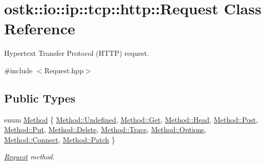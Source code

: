 \hypertarget{classostk_1_1io_1_1ip_1_1tcp_1_1http_1_1_request}{}\section{ostk\+:\+:io\+:\+:ip\+:\+:tcp\+:\+:http\+:\+:Request Class Reference}
\label{classostk_1_1io_1_1ip_1_1tcp_1_1http_1_1_request}


Hypertext Transfer Protocol (H\+T\+TP) request.  




{\ttfamily \#include $<$Request.\+hpp$>$}

\subsection*{Public Types}
\begin{DoxyCompactItemize}
\item 
enum \hyperlink{classostk_1_1io_1_1ip_1_1tcp_1_1http_1_1_request_a07a40d81f4a6fb8443c80afc11571dd3}{Method} \{ \newline
\hyperlink{classostk_1_1io_1_1ip_1_1tcp_1_1http_1_1_request_a07a40d81f4a6fb8443c80afc11571dd3aec0fc0100c4fc1ce4eea230c3dc10360}{Method\+::\+Undefined}, 
\hyperlink{classostk_1_1io_1_1ip_1_1tcp_1_1http_1_1_request_a07a40d81f4a6fb8443c80afc11571dd3ac55582518cba2c464f29f5bae1c68def}{Method\+::\+Get}, 
\hyperlink{classostk_1_1io_1_1ip_1_1tcp_1_1http_1_1_request_a07a40d81f4a6fb8443c80afc11571dd3a98921133d10fbdb0fb6dbb7b2648befe}{Method\+::\+Head}, 
\hyperlink{classostk_1_1io_1_1ip_1_1tcp_1_1http_1_1_request_a07a40d81f4a6fb8443c80afc11571dd3a03d947a2158373c3b9d74325850cb8b9}{Method\+::\+Post}, 
\newline
\hyperlink{classostk_1_1io_1_1ip_1_1tcp_1_1http_1_1_request_a07a40d81f4a6fb8443c80afc11571dd3ad0bf1810982e9728fcf3ac444a015373}{Method\+::\+Put}, 
\hyperlink{classostk_1_1io_1_1ip_1_1tcp_1_1http_1_1_request_a07a40d81f4a6fb8443c80afc11571dd3af2a6c498fb90ee345d997f888fce3b18}{Method\+::\+Delete}, 
\hyperlink{classostk_1_1io_1_1ip_1_1tcp_1_1http_1_1_request_a07a40d81f4a6fb8443c80afc11571dd3add4ec0ac4e58f7c32a01244ae91150b1}{Method\+::\+Trace}, 
\hyperlink{classostk_1_1io_1_1ip_1_1tcp_1_1http_1_1_request_a07a40d81f4a6fb8443c80afc11571dd3adae8ace18bdcbcc6ae5aece263e14fe8}{Method\+::\+Options}, 
\newline
\hyperlink{classostk_1_1io_1_1ip_1_1tcp_1_1http_1_1_request_a07a40d81f4a6fb8443c80afc11571dd3a49ab28040dfa07f53544970c6d147e1e}{Method\+::\+Connect}, 
\hyperlink{classostk_1_1io_1_1ip_1_1tcp_1_1http_1_1_request_a07a40d81f4a6fb8443c80afc11571dd3a156e10596fdc76ee5300bab931d89c0f}{Method\+::\+Patch}
 \}\begin{DoxyCompactList}\small\item\em \hyperlink{classostk_1_1io_1_1ip_1_1tcp_1_1http_1_1_request}{Request} method. \end{DoxyCompactList}
\end{DoxyCompactItemize}
